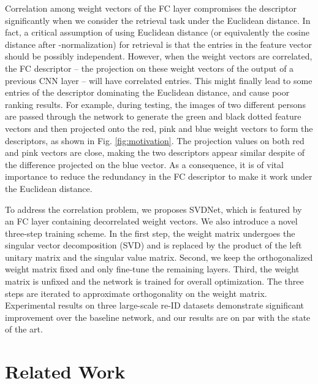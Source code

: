\documentclass[10pt,twocolumn,letterpaper]{article}
\begin{document}
Correlation among weight vectors of the FC layer compromises the descriptor significantly when we consider the retrieval task under the Euclidean distance. In fact, a critical assumption of using Euclidean distance (or equivalently the cosine distance after -normalization) for retrieval is that the entries in the feature vector should be possibly independent. However, when the weight vectors are correlated, the FC descriptor -- the projection on these weight vectors of the output of a previous CNN layer --  will have correlated entries. This might finally lead to some entries of the descriptor dominating the Euclidean distance, and cause poor ranking results. For example, during testing, the images of two different persons are passed through the network to generate the green and black dotted feature vectors and then projected onto the red, pink and blue weight vectors to form the descriptors, as shown in Fig. \ref{fig:motivation}. The projection values on both red and pink vectors are close, making the two descriptors appear similar despite of the difference projected on the blue vector. As a consequence, it is of vital importance to reduce the redundancy in the FC descriptor to make it work under the Euclidean distance.

To address the correlation problem, we proposes SVDNet, which is featured by an FC layer containing decorrelated weight vectors. We also introduce a novel three-step training scheme. In the first step, the weight matrix undergoes the singular vector decomposition (SVD) and is replaced by the product of the left unitary matrix and the singular value matrix. Second, we keep the orthogonalized weight matrix fixed and only fine-tune the remaining layers. Third, the weight matrix is unfixed and the network is trained for overall optimization. The three steps are iterated to approximate orthogonality on the weight matrix. Experimental results on three large-scale re-ID datasets demonstrate significant improvement over the baseline network, and our results are on par with the state of the art.

\section{Related Work}
\end{document}
